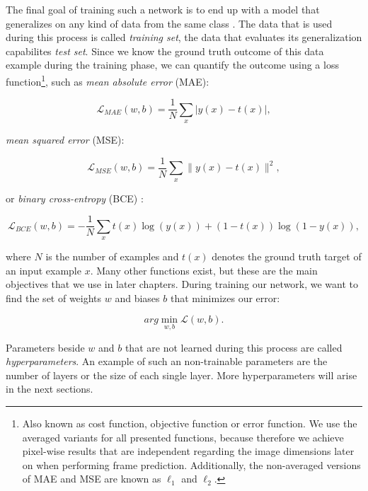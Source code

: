 The final goal of training such a network is to end up with a model that generalizes on any kind of data from the same class \parencite[p. 2]{pattern_and_ml}. The data that is used during this process is called \textit{training set}, the data that evaluates its generalization capabilites \textit{test set}. Since we know the ground truth outcome of this data example during the training phase, we can quantify the outcome using a loss function\footnote{Also known as cost function, objective function or error function. We use the averaged variants for all presented functions, because therefore we achieve pixel-wise results that are independent regarding the image dimensions later on when performing frame prediction. Additionally, the non-averaged versions of MAE and MSE are known as $ \ell_{1} $ and $ \ell_{2} $.}, such as \textit{mean absolute error} (MAE):


\begin{equation} \label{eq:mae}
  \mathcal{L}_{MAE}(w, b)=\frac{1}{N} \sum\limits_{x} | y(x) - t(x) | ,
\end{equation}

\textit{mean squared error} (MSE):

\begin{equation} \label{eq:mse}
  \mathcal{L}_{MSE}(w, b)=\frac{1}{N} \sum\limits_{x} \| y(x) - t(x) \|^2 ,
\end{equation}

or \textit{binary cross-entropy} (BCE) \parencite{conv_lstm_nowcasting}:

\begin{equation} \label{eq:bce}
  \mathcal{L}_{BCE}(w, b)= -\frac{1}{N} \sum\limits_{x} t(x) \log{(y(x))} + (1-t(x)) \log{(1-y(x))} ,
\end{equation}

where $ N $ is the number of examples and $ t(x) $ denotes the ground truth target of an input example $x$. Many other functions exist, but these are the main objectives that we use in later chapters. During training our network, we want to find the set of weights $ w $ and biases $ b $ that minimizes our error:

\begin{equation} \label{eq:min-loss}
  arg\min_{w, b} \mathcal{L}(w, b) .
\end{equation}

Parameters beside $ w $ and $ b $ that are not learned during this process are called \textit{hyperparameters}. An example of such an non-trainable parameters are the number of layers or the size of each single layer. More hyperparameters will arise in the next sections.


